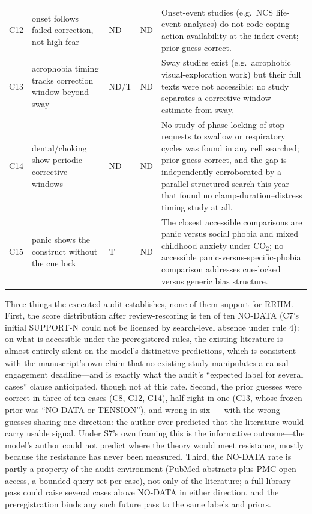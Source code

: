 \documentclass[9pt,twocolumn]{article}
\begin{document}
\begin{table}[!t]
\begin{tabularx}{\textwidth}{p{}p{}p{}p{}X}
C12 & onset follows failed correction, not high fear & ND & ND & Onset-event studies (e.g.\ NCS life-event analyses) do not code coping-action availability at the index event; prior guess correct. \\
C13 & acrophobia timing tracks correction window beyond sway & ND/T & ND & Sway studies exist (e.g.\ acrophobic visual-exploration work) but their full texts were not accessible; no study separates a corrective-window estimate from sway. \\
C14 & dental/choking show periodic corrective windows & ND & ND & No study of phase-locking of stop requests to swallow or respiratory cycles was found in any cell searched; prior guess correct, and the gap is independently corroborated by a parallel structured search this year that found no clamp-duration--distress timing study at all. \\
C15 & panic shows the construct without the cue lock & T & ND & The closest accessible comparisons are panic versus social phobia and mixed childhood anxiety under CO$_2$; no accessible panic-versus-specific-phobia comparison addresses cue-locked versus generic bias structure. \\
\bottomrule
\end{tabularx}
\end{table}

Three things the executed audit establishes, none of them support for RRHM. First, the score distribution after review-rescoring is ten of ten NO-DATA (C7's initial SUPPORT-N could not be licensed by search-level absence under rule 4): on what is accessible under the preregistered rules, the existing literature is almost entirely silent on the model's distinctive predictions, which is consistent with the manuscript's own claim that no existing study manipulates a causal engagement deadline---and is exactly what the audit's ``expected label for several cases'' clause anticipated, though not at this rate. Second, the prior guesses were correct in three of ten cases (C8, C12, C14), half-right in one (C13, whose frozen prior was ``NO-DATA or TENSION''), and wrong in six --- with the wrong guesses sharing one direction: the author over-predicted that the literature would carry usable signal. Under S7's own framing this is the informative outcome---the model's author could not predict where the theory would meet resistance, mostly because the resistance has never been measured. Third, the NO-DATA rate is partly a property of the audit environment (PubMed abstracts plus PMC open access, a bounded query set per case), not only of the literature; a full-library pass could raise several cases above NO-DATA in either direction, and the preregistration binds any such future pass to the same labels and priors.
\end{document}
